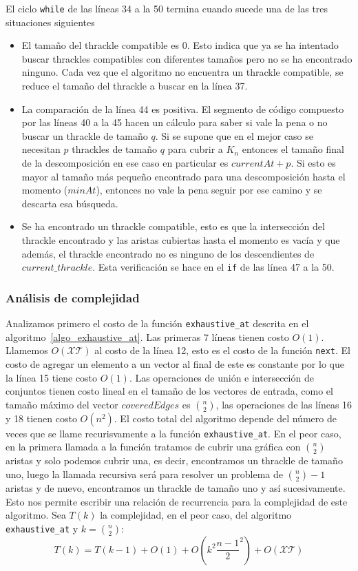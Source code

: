   El ciclo \texttt{while} de las líneas 34 a la 50 termina cuando sucede una de las tres situaciones siguientes
  \begin{itemize}
    \item El tamaño del thrackle compatible es 0. Esto indica que ya se ha intentado buscar thrackles compatibles con diferentes tamaños pero no se ha encontrado ninguno. Cada vez que el algoritmo no encuentra un thrackle compatible, se reduce el tamaño del thrackle a buscar en la línea 37.
    \item La comparación de la línea 44 es positiva. El segmento de código compuesto por las líneas 40 a la 45 hacen un cálculo para saber si vale la pena o no buscar un thrackle de tamaño $q$. Si se supone que en el mejor caso se necesitan $p$ thrackles de tamaño $q$ para cubrir a $K_n$ entonces el tamaño final de la descomposición en ese caso en particular es $currentAt + p$. Si esto es mayor al tamaño más pequeño encontrado para una descomposición hasta el momento ($minAt$), entonces no vale la pena seguir por ese camino y se descarta esa búsqueda.
    \item Se ha encontrado un thrackle compatible, esto es que la intersección del thrackle encontrado y las aristas cubiertas hasta el momento es vacía y que además, el thrackle encontrado no es ninguno de los descendientes de $current\_thrackle$. Esta verificación se hace en el \texttt{if} de las línea 47 a la 50.
  \end{itemize}
  \subsubsection{Análisis de complejidad}

  Analizamos primero el costo de la función \texttt{exhaustive\_at} descrita en el
  algoritmo~\ref{algo_exhaustive_at}. Las primeras 7 líneas tienen costo $O(1)$. Llamemos
  $O(\mathcal{XT})$ al costo de la línea 12, esto es el costo de la función \texttt{next}. El costo de
  agregar un elemento a un vector al final de este es constante por lo que la línea 15 tiene costo $O(1)$.
  Las operaciones de unión e intersección de conjuntos tienen costo lineal en el tamaño de los vectores de
  entrada, como el tamaño máximo del vector $coveredEdges$ es $\binom{n}{2}$, las operaciones de las líneas
  16 y 18 tienen costo $O(n^2)$. El costo total del algoritmo depende del número de veces que se llame
  recurisvamente a la función \texttt{exhaustive\_at}. En el peor caso, en la primera llamada a la función
  tratamos de cubrir una gráfica con $\binom{n}{2}$ aristas y solo podemos cubrir una, es decir, encontramos un thrackle de tamaño uno, luego la llamada recursiva será para resolver un problema de $\binom{n}{2}-1$ aristas y de nuevo, encontramos un thrackle de tamaño uno y así sucesivamente. Esto nos permite escribir una relación de recurrencia para la complejidad de este algoritmo. Sea $T(k)$ la complejidad, en el peor caso, del algoritmo \texttt{exhaustive\_at} y $k=\binom{n}{2}$:
  \[ T(k) = T(k-1) + O(1) + O(k^2 \frac{n-1}{2}^2) + O(\mathcal{XT}) \]

